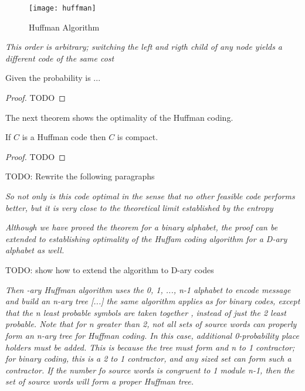 \begin{figure}[h]
\centering\texttt{[image: huffman]}
\caption{\label{fig:Huffman-Algorithm}Huffman Algorithm}
\end{figure}

\emph{This order is arbitrary; switching the left and rigth child of any node yields a different code of the same cost}


\begin{proposition}
Given the probability is ...
\end{proposition}
\begin{proof}
{\color{red} TODO}
\end{proof}

The next theorem shows the optimality of the Huffman coding.

\begin{theorem}
If $C$ is a Huffman code then $C$ is compact.
\end{theorem}
\begin{proof}
{\color{red} TODO}
\end{proof}

{\color{red} TODO: Rewrite the following paragraphs}

\emph{So not only is this code optimal in the sense that no other feasible code performs better, but it is very close to the theoretical limit established by the entropy}

\emph{Although we have proved the theorem for a binary alphabet, the proof can be extended to establishing optimality of the Huffam coding algorithm for a D-ary alphabet as well.}

{\color{red} TODO: show how to extend the algorithm to D-ary codes}

\emph{Then -ary Huffman algorithm uses the {0, 1, ..., n-1} alphabet to encode message and build an n-ary tree [...] the same algorithm applies as for binary codes, except that the n least probable symbols are taken together , instead of just the 2 least probable. Note that for n greater than 2, not all sets of source words  can properly form an n-ary tree for Huffman coding. In this case, additional 0-probability place holders must be added. This is because the tree must form and n to 1 contractor; for binary coding, this is a 2 to 1 contractor, and any sized set can form such a contractor. If the number fo source words is congruent to 1 module n-1, then the set of source words will form a proper Huffman tree.}

